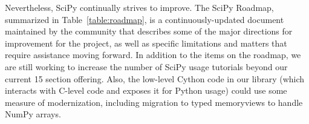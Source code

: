 \documentclass[fleqn,10pt]{wlscirep}
\begin{document}
Nevertheless, SciPy continually strives to improve.
The SciPy Roadmap\cite{SciPy_roadmap_1,SciPy_roadmap_dev}, summarized in Table~\ref{table:roadmap}, is a
continuously-updated document
maintained by the community that describes some of the major directions for
improvement for the project, as well as specific limitations and matters that
require assistance moving forward.
In addition to the items on the roadmap, 
we are still working to increase the number of SciPy usage tutorials beyond
our current 15 section offering\cite{SciPy_tutorials}. 
Also, the low-level Cython code in our library (which interacts with C-level code and
exposes it for Python usage) could use some measure of modernization, including
migration to typed memoryviews to handle NumPy arrays.

%
\end{document}
